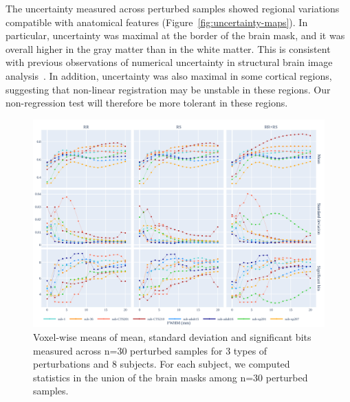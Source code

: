 \documentclass{article}
\begin{document}
The uncertainty measured across perturbed samples showed regional variations
compatible with anatomical features (Figure~\ref{fig:uncertainty-maps}). In
particular, uncertainty was maximal at the border of the brain mask, and it was
overall higher in the gray matter than in the white matter. This is consistent
with previous observations of numerical uncertainty in structural brain image
analysis~\cite{salari2021accurate}. In addition, uncertainty was also maximal in
some cortical regions, suggesting that non-linear registration may be unstable
in these regions. Our non-regression test will therefore be more tolerant in
these regions.


\begin{figure}
    \centering
    \includegraphics[width=\linewidth]{figures/stats.pdf}
    \caption{Voxel-wise means of mean, standard deviation and significant bits
        measured across n=30 perturbed samples for 3 types of perturbations and 8
        subjects. For each subject, we computed statistics in the union of the brain
        masks among n=30 perturbed samples.}
    \label{fig:significant-digits}
\end{figure}
\end{document}
